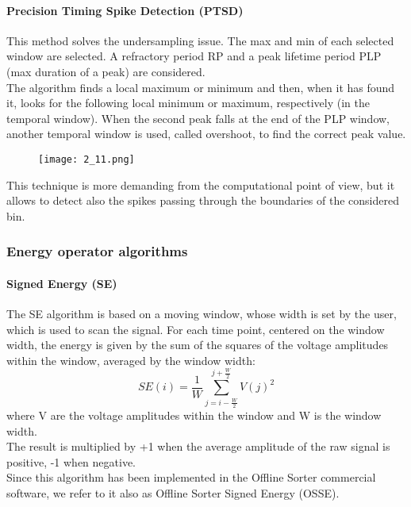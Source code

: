\paragraph{Precision Timing Spike Detection (PTSD)}
This method solves the undersampling issue. The max and min of each selected window are selected. A refractory period RP and a  peak lifetime period PLP (max duration of a peak) are considered. \\
The algorithm finds a local maximum or minimum and then, when it has found it, looks for the following local minimum or maximum, respectively (in the temporal window). When the second peak falls at the end of the PLP window, another temporal window is used, called overshoot, to find the correct peak value. \\
\begin{figure}[H]
    \centering
    \texttt{[image: 2\_11.png]}
\end{figure}
This technique is more demanding from the computational point of view, but it allows to detect
also the spikes passing through the boundaries of the considered bin.
\subsubsection{Energy operator algorithms}
\paragraph{Signed Energy (SE)}
The SE algorithm is based on a moving window, whose width is set by the user, which is used to scan the signal. For each time point, centered on the window width, the energy is given by the sum of the squares of the voltage amplitudes within the window, averaged by the window width:
\begin{equation*}
    SE(i)=\frac{1}{W}\sum_{j=i-\frac{W}{2}}^{j+\frac{W}{2}}V(j)^2
\end{equation*}
where V are the voltage amplitudes within the window and W is the window width.\\
The result is multiplied by +1 when the average amplitude of the raw signal is positive, -1 when negative.\\
Since this algorithm has been implemented in the Offline Sorter commercial software, we refer to it also as Offline Sorter Signed Energy (OSSE).
